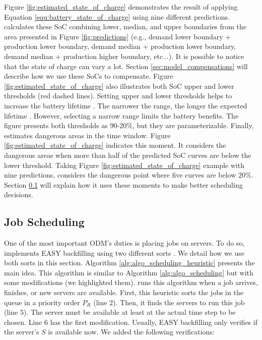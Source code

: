 Figure \ref{fig:estimated_state_of_charge} demonstrates the result of applying Equation \ref{equ:battery_state_of_charge} using nine different predictions. \emph{\systemName} calculates these SoC combining lower, median, and upper boundaries from the area presented in Figure \ref{fig:predictions} (e.g., demand lower boundary + production lower boundary, demand median + production lower boundary, demand median + production higher boundary, etc...). It is possible to notice that the state of charge can vary a lot. Section \ref{sec:model_compensations} will describe how we use these SoCs to compensate. Figure \ref{fig:estimated_state_of_charge} also illustrates both SoC upper and lower thresholds (red dashed lines). Setting upper and lower thresholds helps to increase the battery lifetime \cite{xu2016modeling}. The narrower the range, the longer the expected lifetime \cite{xu2016modeling}. However, selecting a narrow range limits the battery benefits. The figure presents both thresholds as 90-20\%, but they are parameterizable. Finally, \emph{\systemName} estimates dangerous areas in the time window. Figure \ref{fig:estimated_state_of_charge} indicates this moment. It considers the dangerous areas when more than half of the predicted SoC curves are below the lower threshold. Taking Figure \ref{fig:estimated_state_of_charge} example with nine predictions, \emph{\systemName} considers the dangerous point where five curves are below 20\%. Section \ref{sec:model_easy} will explain how it uses these moments to make better scheduling decisions.


\subsection{Job Scheduling}
\label{sec:model_easy}

One of the most important ODM's duties is placing jobs on servers. To do so, \emph{\systemName} implements EASY backfilling using two different sorts \cite{mu2001utilization, lelong2018tuning}. We detail how we use both sorts in this section. Algorithm \ref{alg:algo_scheduling_heuristic} presents the main idea. This algorithm is similar to Algorithm \ref{alg:algo_scheduling} but with some modifications (we highlighted them). \emph{\systemName} runs this algorithm when a job arrives, finishes, or new servers are available. First, this heuristic sorts the jobs in the queue in a priority order $P_{R}$ (line 2). Then, it finds the servers to run this job (line 5). The server must be available at least at the actual time step to be chosen. Line 6 has the first modification. Usually, EASY backfilling only verifies if the server's $S$ is available now. We added the following verifications:

